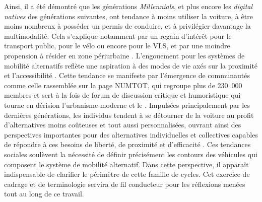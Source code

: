 \begin{refsegment}
Ainsi, il a été démontré que les générations \textsl{Millennials}, et plus encore les \textsl{digital natives} des générations suivantes, ont tendance à moins utiliser la voiture, à être moins nombreux à posséder un permis de conduire, et à privilégier davantage la multimodalité. Cela s’explique notamment par un regain d'intérêt pour le transport public, pour le vélo ou encore pour le \acrshort{VLS}, et par une moindre propension à résider en zone périurbaine \textcolor{blue}{\autocites[62-63]{polzin_impact_2014}[32-39]{circella_what_2016}{garikapati_activity_2016}[7]{hntb_america_2016}[9-10]{alfaraz_youth_2017}[12]{wang_bike_2018}}. L'engouement pour les systèmes de mobilité alternatifs reflète une aspiration à des modes de vie axés sur la proximité et l'accessibilité \textcolor{blue}{\autocite[99-100]{levine_mobility_2019}}. Cette tendance se manifeste par l’émergence de communautés comme celle rassemblée sur la page  \acrfull{NUMTOT}, qui regroupe plus de 230~000 membres et sert à la fois de forum de discussion critique et humoristique qui tourne en dérision l'urbanisme moderne et le  {\autocites{bliss_future_2018}{demain_la_ville_numtot_2018}}. Impulsées principalement par les dernières générations, les individus tendent à se détourner de la voiture au profit d’alternatives moins coûteuses et tout aussi personnalisées, ouvrant ainsi des perspectives importantes pour des alternatives individuelles et collectives capables de répondre à ces besoins de liberté, de proximité et d’efficacité \textcolor{blue}{\autocite[11]{frere_services_2018}}. Ces tendances sociales soulèvent la nécessité de définir précisément les contours des véhicules qui composent le système de mobilité alternatif. Dans cette perspective, il apparaît indispensable de clarifier le périmètre de cette famille de cycles. Cet exercice de cadrage et de terminologie servira de fil conducteur pour les réflexions menées tout au long de ce travail.%


\end{refsegment}
